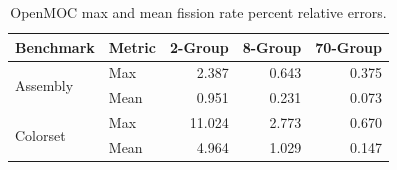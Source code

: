 \begin{table}[h!]
  \centering
  \caption{OpenMOC max and mean fission rate percent relative errors.}
  \label{tab:fiss-errors}
  \begin{tabular}{l l r r r}
  \toprule
  \textbf{Benchmark} & \textbf{Metric} & \textbf{2-Group} & \textbf{8-Group} & \textbf{70-Group} \\
  \midrule
  \multirow{2}{*}{Assembly} & Max  & 2.387 & 0.643 & 0.375 \\
                            & Mean & 0.951 & 0.231 & 0.073 \\
  \midrule
  \multirow{2}{*}{Colorset} & Max  & 11.024 & 2.773 & 0.670 \\
                            & Mean & 4.964  & 1.029 & 0.147 \\
  \bottomrule
\end{tabular}
\end{table}

